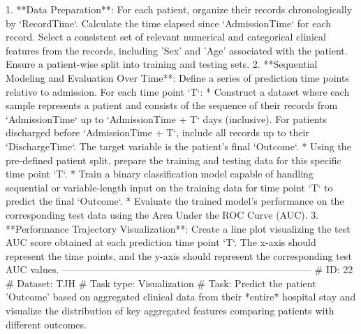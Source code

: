 \begin{tcolorbox}[colback=cadmiumgreen!5!white,colframe=forestgreen!75!white,breakable,title=\textit{Generated analytical tasks in task 4.}]
\begin{VerbatimWrap}
 1. **Data Preparation**: For each patient, organize their records chronologically by `RecordTime`. Calculate the time elapsed since `AdmissionTime` for each record. Select a consistent set of relevant numerical and categorical clinical features from the records, including 'Sex' and 'Age' associated with the patient. Ensure a patient-wise split into training and testing sets.
 2. **Sequential Modeling and Evaluation Over Time**: Define a series of prediction time points relative to admission. For each time point `T`:
  * Construct a dataset where each sample represents a patient and consists of the sequence of their records from `AdmissionTime` up to `AdmissionTime + T` days (inclusive). For patients discharged before `AdmissionTime + T`, include all records up to their `DischargeTime`. The target variable is the patient's final `Outcome`.
  * Using the pre-defined patient split, prepare the training and testing data for this specific time point `T`.
  * Train a binary classification model capable of handling sequential or variable-length input on the training data for time point `T` to predict the final `Outcome`.
  * Evaluate the trained model's performance on the corresponding test data using the Area Under the ROC Curve (AUC).
 3. **Performance Trajectory Visualization**: Create a line plot visualizing the test AUC score obtained at each prediction time point `T`. The x-axis should represent the time points, and the y-axis should represent the corresponding test AUC values.
-----------------------------------------------------------------------------
# ID: 22  
# Dataset: TJH 
# Task type: Visualization
# Task: Predict the patient 'Outcome' based on aggregated clinical data from their *entire* hospital stay and visualize the distribution of key aggregated features comparing patients with different outcomes.
 

\end{VerbatimWrap}
\end{tcolorbox}
